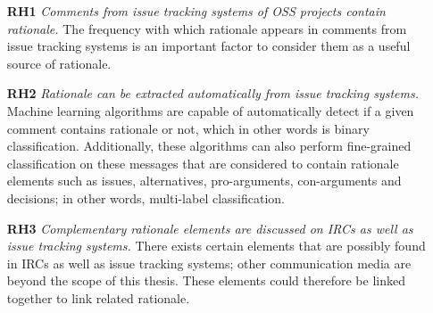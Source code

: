 \documentclass[a4paper,12pt,twoside]{report}
\begin{document}
\begin{itemize}
\item[\textbf{RH1}] \textit{Comments from issue tracking systems of \acs{OSS} projects contain rationale.} The frequency with which rationale appears in comments from issue tracking systems is an important factor to consider them as a useful source of rationale.   
\item[\textbf{RH2}] \textit{Rationale can be extracted automatically from issue tracking systems.} Machine learning algorithms are capable of automatically detect if a given comment contains rationale or not, which in other words is binary classification. Additionally, these algorithms can also perform fine-grained classification on these messages that are considered to contain rationale elements such as issues, alternatives, pro-arguments, con-arguments and decisions; in other words, multi-label classification. 
\item[\textbf{RH3}] \textit{Complementary rationale elements are discussed on \acs{IRC}s as well as issue tracking systems.} There exists certain elements that are possibly found in \acs{IRC}s as well as issue tracking systems; other communication media are beyond the scope of this thesis. These elements could therefore be linked together to link related rationale.    
\end{itemize}
\end{document}
